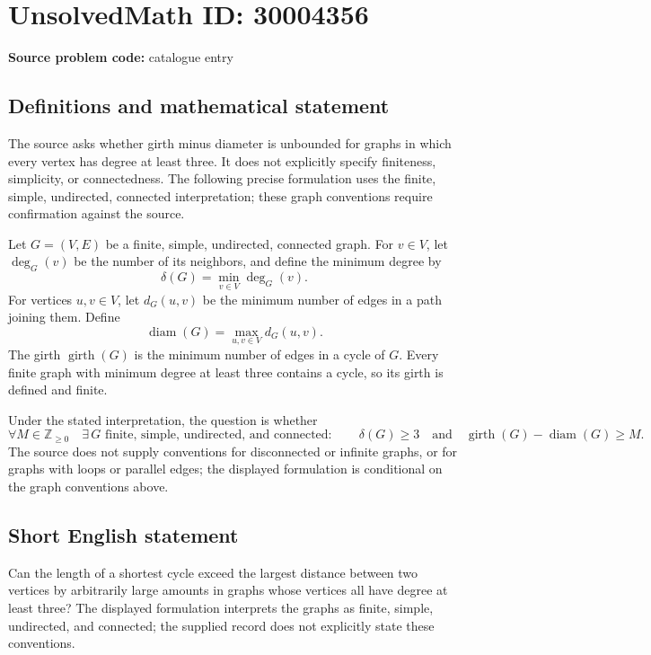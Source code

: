 \documentclass[11pt]{article}
\newcommand{\Z}{\mathbb{Z}}
\begin{document}
\section*{UnsolvedMath ID: 30004356}
\textbf{Source problem code:} catalogue entry
\subsection{Definitions and mathematical statement}
The source asks whether girth minus diameter is unbounded for graphs in which every vertex has degree at least three. It does not explicitly specify finiteness, simplicity, or connectedness. The following precise formulation uses the finite, simple, undirected, connected interpretation; these graph conventions require confirmation against the source.

Let \(G=(V,E)\) be a finite, simple, undirected, connected graph. For \(v\in V\), let \(\deg_G(v)\) be the number of its neighbors, and define the minimum degree by
\[
\delta(G)=\min_{v\in V}\deg_G(v).
\]
For vertices \(u,v\in V\), let \(d_G(u,v)\) be the minimum number of edges in a path joining them. Define
\[
\operatorname{diam}(G)=\max_{u,v\in V}d_G(u,v).
\]
The girth \(\operatorname{girth}(G)\) is the minimum number of edges in a cycle of \(G\). Every finite graph with minimum degree at least three contains a cycle, so its girth is defined and finite.

Under the stated interpretation, the question is whether
\[
\forall M\in\Z_{\ge 0}\quad \exists\,G\text{ finite, simple, undirected, and connected}:
\qquad \delta(G)\ge 3
\quad\text{and}\quad
\operatorname{girth}(G)-\operatorname{diam}(G)\ge M.
\]
The source does not supply conventions for disconnected or infinite graphs, or for graphs with loops or parallel edges; the displayed formulation is conditional on the graph conventions above.
\subsection{Short English statement}
Can the length of a shortest cycle exceed the largest distance between two vertices by arbitrarily large amounts in graphs whose vertices all have degree at least three? The displayed formulation interprets the graphs as finite, simple, undirected, and connected; the supplied record does not explicitly state these conventions.
\end{document}
